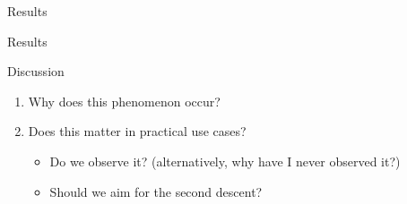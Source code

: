 \documentclass[8pt]{beamer}
\begin{document}
	\begin{frame}{Results}
		\centering
		\vfill
		\vfill
	\end{frame}

	\begin{frame}{Results}
		\centering
		\vfill
		\vfill
	\end{frame}

	\begin{frame}{Discussion}
		\begin{enumerate}
			\item Why does this phenomenon occur?
			\item Does this matter in practical use cases?
			\begin{itemize}
				\item Do we observe it? (alternatively, why have I never observed it?)
				\item Should we aim for the second descent?
			\end{itemize}
		\end{enumerate}
	\end{frame}
\end{document}
